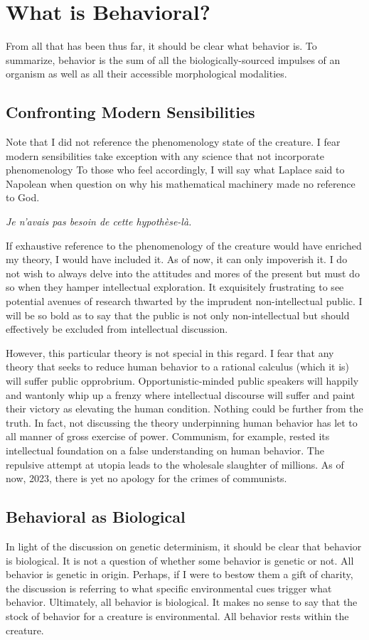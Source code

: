 \documentclass[12pt]{article}
\begin{document}
\section{What is Behavioral?}
From all that has been thus far, it should be clear what behavior is.
To summarize, behavior is the sum of all the biologically-sourced impulses of an organism as well as all their accessible morphological modalities.

\subsection{Confronting Modern Sensibilities}
Note that I did not reference the phenomenology state of the creature.
I fear modern sensibilities take exception with any science that not incorporate phenomenology
To those who feel accordingly, I will say what Laplace said to Napolean when question on why his mathematical machinery made no reference to God.

\textit{Je n’avais pas besoin de cette hypothèse-là.}

If exhaustive reference to the phenomenology of the creature would have enriched my theory, I would have included it.
As of now, it can only impoverish it.
I do not wish to always delve into the attitudes and mores of the present but must do so when they hamper intellectual exploration.
It exquisitely frustrating to see potential avenues of research thwarted by the imprudent non-intellectual public.
I will be so bold as to say that the public is not only non-intellectual but should effectively be excluded from intellectual discussion.

However, this particular theory is not special in this regard.
I fear that any theory that seeks to reduce human behavior to a rational calculus (which it is) will suffer public opprobrium.
Opportunistic-minded public speakers will happily and wantonly whip up a frenzy where intellectual discourse will suffer and paint their victory as elevating the human condition.
Nothing could be further from the truth.
In fact, not discussing the theory underpinning human behavior has let to all manner of gross exercise of power.
Communism, for example, rested its intellectual foundation on a false understanding on human behavior.
The repulsive attempt at utopia leads to the wholesale slaughter of millions.
As of now, 2023, there is yet no apology for the crimes of communists.

\subsection{Behavioral as Biological}
In light of the discussion on genetic determinism, it should be clear that behavior is biological.
It is not a question of whether some behavior is genetic or not.
All behavior is genetic in origin.
Perhaps, if I were to bestow them a gift of charity, the discussion is referring to what specific environmental cues trigger what behavior.
Ultimately, all behavior is biological.
It makes no sense to say that the stock of behavior for a creature is environmental.
All behavior rests within the creature.
\end{document}
